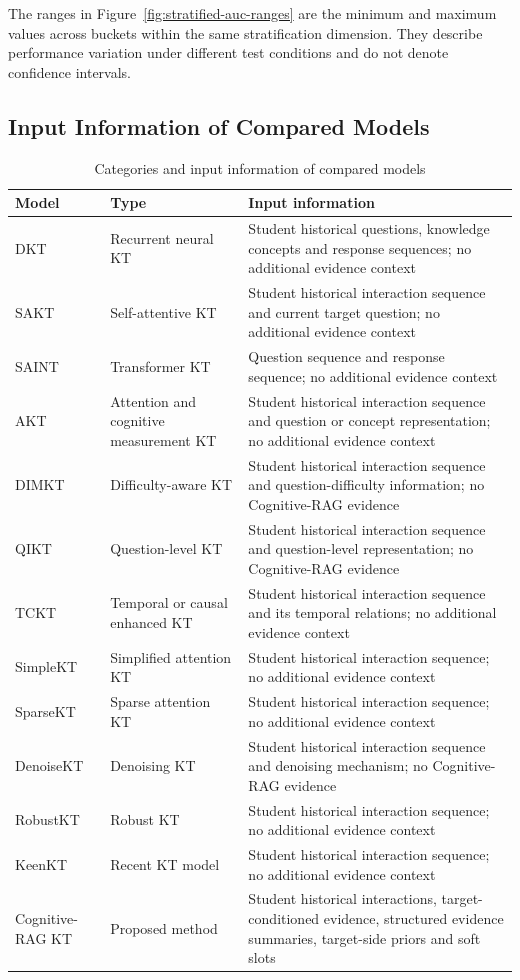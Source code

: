 \documentclass[a4paper,12pt]{article}
\numberwithin{table}{section}
\begin{document}
The ranges in Figure~\ref{fig:stratified-auc-ranges} are the minimum and maximum values across buckets within the same stratification dimension. They describe performance variation under different test conditions and do not denote confidence intervals.

\subsection{Input Information of Compared Models}

\begin{table}[htbp]
\centering
\small
\caption{Categories and input information of compared models}
\label{tab:appendix-comparison-models}
\begin{tabularx}{\textwidth}{p{2.6cm}p{3.3cm}X}
\toprule
\textbf{Model} & \textbf{Type} & \textbf{Input information} \\
\midrule
DKT & Recurrent neural KT & Student historical questions, knowledge concepts and response sequences; no additional evidence context \\
SAKT & Self-attentive KT & Student historical interaction sequence and current target question; no additional evidence context \\
SAINT & Transformer KT & Question sequence and response sequence; no additional evidence context \\
AKT & Attention and cognitive measurement KT & Student historical interaction sequence and question or concept representation; no additional evidence context \\
DIMKT & Difficulty-aware KT & Student historical interaction sequence and question-difficulty information; no Cognitive-RAG evidence \\
QIKT & Question-level KT & Student historical interaction sequence and question-level representation; no Cognitive-RAG evidence \\
TCKT & Temporal or causal enhanced KT & Student historical interaction sequence and its temporal relations; no additional evidence context \\
SimpleKT & Simplified attention KT & Student historical interaction sequence; no additional evidence context \\
SparseKT & Sparse attention KT & Student historical interaction sequence; no additional evidence context \\
DenoiseKT & Denoising KT & Student historical interaction sequence and denoising mechanism; no Cognitive-RAG evidence \\
RobustKT & Robust KT & Student historical interaction sequence; no additional evidence context \\
KeenKT & Recent KT model & Student historical interaction sequence; no additional evidence context \\
Cognitive-RAG KT & Proposed method & Student historical interactions, target-conditioned evidence, structured evidence summaries, target-side priors and soft slots \\
\bottomrule
\end{tabularx}
\end{table}
\end{document}
